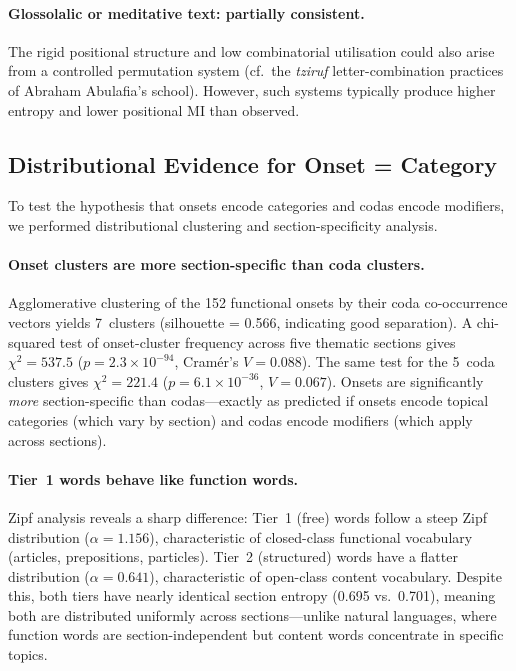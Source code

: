 \paragraph{Glossolalic or meditative text: partially consistent.}
The rigid positional structure and low combinatorial utilisation could also arise from a controlled permutation system (cf.\ the \emph{tziruf} letter-combination practices of Abraham Abulafia's school).  However, such systems typically produce higher entropy and lower positional MI than observed.

\subsection{Distributional Evidence for Onset = Category}

To test the hypothesis that onsets encode categories and codas encode modifiers, we performed distributional clustering and section-specificity analysis.

\paragraph{Onset clusters are more section-specific than coda clusters.}
Agglomerative clustering of the 152 functional onsets by their coda co-occurrence vectors yields 7~clusters (silhouette = 0.566, indicating good separation).  A chi-squared test of onset-cluster frequency across five thematic sections gives $\chi^2 = 537.5$ ($p = 2.3 \times 10^{-94}$, Cram\'er's $V = 0.088$).  The same test for the 5~coda clusters gives $\chi^2 = 221.4$ ($p = 6.1 \times 10^{-36}$, $V = 0.067$).  Onsets are significantly \emph{more} section-specific than codas---exactly as predicted if onsets encode topical categories (which vary by section) and codas encode modifiers (which apply across sections).

\paragraph{Tier~1 words behave like function words.}
Zipf analysis reveals a sharp difference: Tier~1 (free) words follow a steep Zipf distribution ($\alpha = 1.156$), characteristic of closed-class functional vocabulary (articles, prepositions, particles).  Tier~2 (structured) words have a flatter distribution ($\alpha = 0.641$), characteristic of open-class content vocabulary.  Despite this, both tiers have nearly identical section entropy (0.695 vs.\ 0.701), meaning both are distributed uniformly across sections---unlike natural languages, where function words are section-independent but content words concentrate in specific topics.

